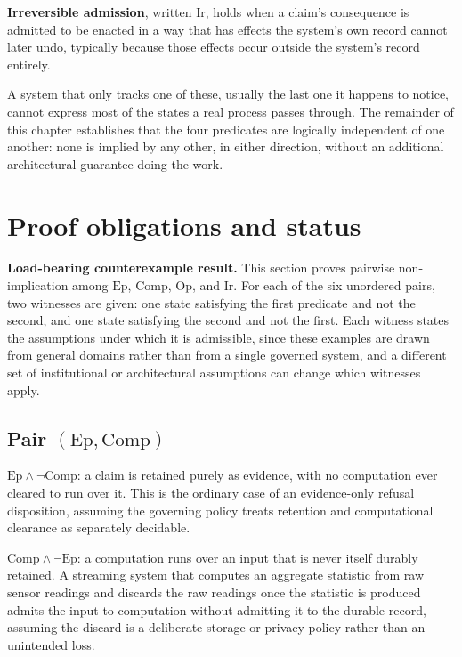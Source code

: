 \documentclass[11pt,openany]{book}
\begin{document}
\textbf{Irreversible admission}, written \(\mathrm{Ir}\), holds when a
claim's consequence is admitted to be enacted in a way that has effects the
system's own record cannot later undo, typically because those effects occur
outside the system's record entirely.

A system that only tracks one of these, usually the last one it happens to
notice, cannot express most of the states a real process passes through. The
remainder of this chapter establishes that the four predicates are logically
independent of one another: none is implied by any other, in either direction,
without an additional architectural guarantee doing the work.

\section{Proof obligations and status}
\textbf{Load-bearing counterexample result.} This section proves pairwise
non-implication among \(\mathrm{Ep}\), \(\mathrm{Comp}\),
\(\mathrm{Op}\), and \(\mathrm{Ir}\). For each of the six unordered pairs,
two witnesses are given: one state satisfying the first predicate and not the
second, and one state satisfying the second and not the first. Each witness
states the assumptions under which it is admissible, since these examples are
drawn from general domains rather than from a single governed system, and a
different set of institutional or architectural assumptions can change which
witnesses apply.

\subsection{Pair \texorpdfstring{\((\mathrm{Ep},\mathrm{Comp})\)}{(Ep, Comp)}}

\(\mathrm{Ep}\land\neg\mathrm{Comp}\): a claim is retained purely as
evidence, with no computation ever cleared to run over it. This is the ordinary
case of an evidence-only refusal disposition, assuming the governing policy
treats retention and computational clearance as separately decidable.

\(\mathrm{Comp}\land\neg\mathrm{Ep}\): a computation runs over an input
that is never itself durably retained. A streaming system that computes an
aggregate statistic from raw sensor readings and discards the raw readings
once the statistic is produced admits the input to computation without
admitting it to the durable record, assuming the discard is a deliberate
storage or privacy policy rather than an unintended loss.
\end{document}
